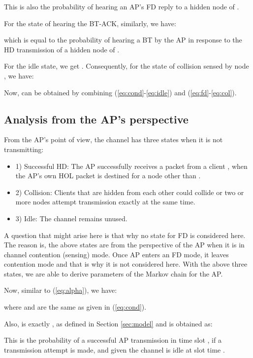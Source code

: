 \documentclass[10pt,journal,cspaper,compsoc]{IEEEtran}
\begin{document}
\normalsize

This is also the probability of hearing an AP's FD reply to a hidden node of .


For the state of hearing the BT-ACK, similarly, we have:
 \small

\normalsize

which is equal to the probability of hearing a BT by the AP in response to the HD transmission of a hidden node of .

For the idle state, we get . Consequently, for the state of collision sensed by node , we have:

\small

\normalsize

Now,  can be obtained by combining (\ref{eq:cond}-\ref{eq:idle}) and (\ref{eq:fd}-\ref{eq:col}).


\subsection{Analysis from the AP's perspective}
From the AP's point of view, the channel has three states when it is not transmitting:

\begin{itemize}
\item 1) Successful HD: The AP successfully receives a packet from a client , when the AP's own HOL packet is destined for a node other than .
\item 2) Collision: Clients that are hidden from each other could collide or two or more nodes attempt transmission exactly at the same time. 
\item 3) Idle: The channel remains unused.
\end{itemize}
A question that might arise here is that why no state for FD is considered here. The reason is, the above states are from the perspective of the AP when it is in channel contention (sensing) mode. Once AP enters an FD mode, it leaves contention mode and that is why it is not considered here. With the above  three states, we are able to derive parameters of the Markov chain  for the AP.  


Now, similar to (\ref{eq:alpha}), we have:
\small

\normalsize

where  and  are the same as given in (\ref{eq:cond}). 

Also,  is exactly , as defined in Section \ref{sec:model} and is obtained as:


This is the probability of a successful AP transmission in time slot , if a transmission attempt is made, and given the channel is idle at slot time .
\end{document}
